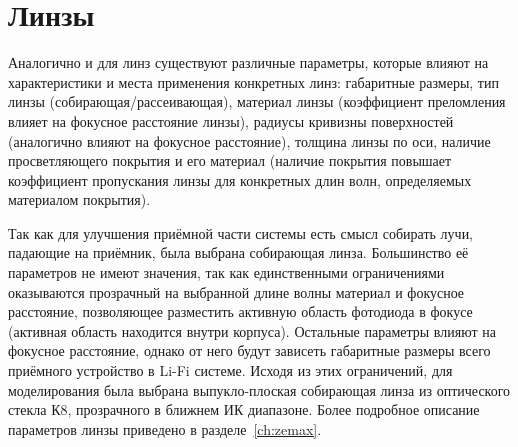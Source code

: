 \section{Линзы}

Аналогично и для линз существуют различные параметры, которые влияют на характеристики и места применения конкретных линз: габаритные размеры, тип линзы (собирающая/рассеивающая), материал линзы (коэффициент преломления влияет на фокусное расстояние линзы), радиусы кривизны поверхностей (аналогично влияют на фокусное расстояние), толщина линзы по оси, наличие просветляющего покрытия и его материал (наличие покрытия повышает коэффициент пропускания линзы для конкретных длин волн, определяемых материалом покрытия).

Так как для улучшения приёмной части системы есть смысл собирать лучи, падающие на приёмник, была выбрана собирающая линза. Большинство её параметров не имеют значения, так как единственными ограничениями оказываются прозрачный на выбранной длине волны материал и фокусное расстояние, позволяющее разместить активную область фотодиода в фокусе (активная область находится внутри корпуса). Остальные параметры влияют на фокусное расстояние, однако от него будут зависеть габаритные размеры всего приёмного устройство в Li-Fi системе. Исходя из этих ограничений, для моделирования была выбрана выпукло-плоская собирающая линза из оптического стекла К8, прозрачного в ближнем ИК диапазоне. Более подробное описание параметров линзы приведено в разделе~\ref{ch:zemax}.